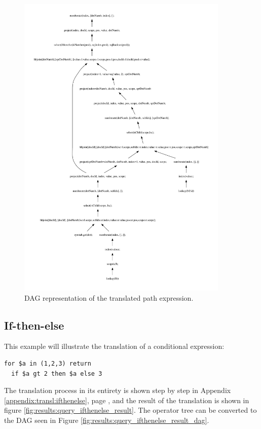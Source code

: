 \newpage
\begin{figure}[!htp]
\begin{center}
  \includegraphics[width=0.9\textwidth]{img/graphs/TD_patExprPred_dag}
  \caption{DAG representation of the translated path expression.}
  \label{fig:results:query_pathpred_result_dag}
\end{center}
\end{figure}

\newpage

\subsection{If-then-else}
This example will illustrate the translation of a conditional expression:
\begin{Verbatim}
for $a in (1,2,3) return
  if $a gt 2 then $a else 3
\end{Verbatim}
The translation process in its entirety is shown step by step in Appendix \ref{appendix:transl:ifthenelse}, page
\pageref{appendix:transl:ifthenelse}, and the result of the translation is shown in figure
\ref{fig:results:query_ifthenelse_result}. The operator tree can be converted to the DAG seen in Figure
\ref{fig:results:query_ifthenelse_result_dag}.

